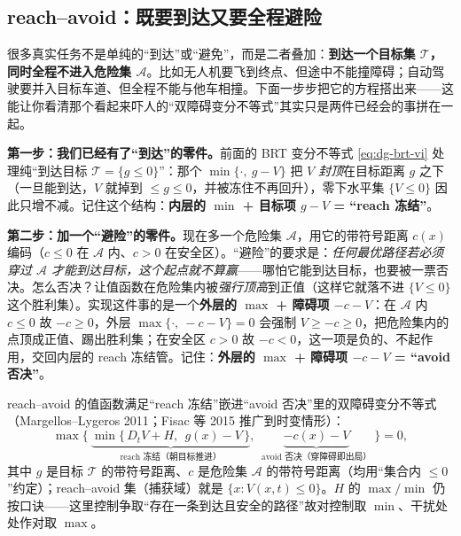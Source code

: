 \subsection{reach--avoid：既要到达又要全程避险}
\label{sec:dg-reachavoid}
很多真实任务不是单纯的“到达”或“避免”，而是二者叠加：\textbf{到达一个目标集 $\mathcal{T}$，同时全程不进入危险集 $\mathcal{A}$}。比如无人机要飞到终点、但途中不能撞障碍；自动驾驶要并入目标车道、但全程不能与他车相撞。下面一步步把它的方程搭出来——这能让你看清那个看起来吓人的“双障碍变分不等式”其实只是两件已经会的事拼在一起。

\textbf{第一步：我们已经有了“到达”的零件。}\;前面的 BRT 变分不等式 \cref{eq:dg-brt-vi} 处理纯“到达目标 $\mathcal{T}=\{g\le0\}$”：那个 $\min\{\cdot,\ g-V\}$ 把 $V$ \emph{封顶}在目标距离 $g$ 之下（一旦能到达，$V$ 就掉到 $\le g\le0$，并被冻住不再回升），零下水平集 $\{V\le0\}$ 因此只增不减。记住这个结构：\textbf{内层的 $\min$ + 目标项 $g-V$ = “reach 冻结”}。

\textbf{第二步：加一个“避险”的零件。}\;现在多一个危险集 $\mathcal{A}$，用它的带符号距离 $c(x)$ 编码（$c\le0$ 在 $\mathcal{A}$ 内、$c>0$ 在安全区）。“避险”的要求是：\emph{任何最优路径若必须穿过 $\mathcal{A}$ 才能到达目标，这个起点就不算赢}——哪怕它能到达目标，也要被一票否决。怎么否决？让值函数在危险集内被\emph{强行顶高}到正值（这样它就落不进 $\{V\le0\}$ 这个胜利集）。实现这件事的是一个\textbf{外层的 $\max$ + 障碍项 $-c-V$}：在 $\mathcal{A}$ 内 $c\le0$ 故 $-c\ge0$，外层 $\max\{\cdot,\ -c-V\}=0$ 会强制 $V\ge-c\ge0$，把危险集内的点顶成正值、踢出胜利集；在安全区 $c>0$ 故 $-c<0$，这一项是负的、不起作用，交回内层的 reach 冻结管。记住：\textbf{外层的 $\max$ + 障碍项 $-c-V$ = “avoid 否决”}。

\begin{theorem}
\label{thm:dg-reachavoid}
reach--avoid 的值函数满足“reach 冻结”嵌进“avoid 否决”里的双障碍变分不等式（Margellos--Lygeros 2011\cite{margellos2011hamilton}；Fisac 等 2015 推广到时变情形\cite{fisac2015reach}）：
\begin{equation}
  \max\Big\{\ \underbrace{\min\big\{\,D_t V+H,\ \ g(x)-V\,\big\}}_{\text{reach 冻结（朝目标推进）}},\ \ \underbrace{-c(x)-V}_{\text{avoid 否决（穿障碍即出局）}}\ \Big\}=0,
  \label{eq:dg-reachavoid}
\end{equation}
其中 $g$ 是目标 $\mathcal{T}$ 的带符号距离、$c$ 是危险集 $\mathcal{A}$ 的带符号距离（均用“集合内 $\le0$”约定）；reach--avoid 集（捕获域）就是 $\{x:V(x,t)\le0\}$。$H$ 的 $\max/\min$ 仍按口诀——这里控制争取“存在一条到达且安全的路径”故对控制取 $\min$、干扰处处作对取 $\max$。
\end{theorem}

